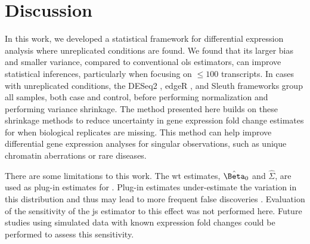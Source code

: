 \section{Discussion}

In this work, we developed a statistical framework for differential expression analysis where unreplicated conditions are found.
We found that its larger bias and smaller variance, compared to conventional \gls{ols} estimators, can improve statistical inferences, particularly when focusing on $\le 100$ transcripts.
In cases with unreplicated conditions, the DESeq2 \cite{loveModeratedEstimationFold2014}, edgeR \cite{robinsonEdgeRBioconductorPackage2010}, and Sleuth \cite{pimentelDifferentialAnalysisRNAseq2017,yiGenelevelDifferentialAnalysis2018} frameworks group all samples, both case and control, before performing normalization and performing variance shrinkage.
The method presented here builds on these shrinkage methods to reduce uncertainty in gene expression fold change estimates for when biological replicates are missing.
This method can help improve differential gene expression analyses for singular observations, such as unique chromatin aberrations or rare diseases.

There are some limitations to this work.
The \gls{wt} estimates, $\hat{\Beta}_0$ and $\hat{\Sigma}$, are used as plug-in estimates for .
Plug-in estimates under-estimate the variation in this distribution and thus may lead to more frequent false discoveries \cite{efronIntroductionBootstrap1993}.
Evaluation of the sensitivity of the \gls{js} estimator to this effect was not performed here.
Future studies using simulated data with known expression fold changes could be performed to assess this sensitivity.

